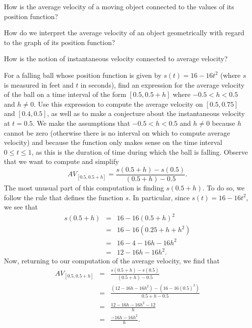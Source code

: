 \documentclass[symmetric,justified,marginals=justified,notoc]{tufte-book}
\theoremstyle{definition}
\begin{document}
\begin{goals}
\item How is the average velocity of a moving object connected to the values of its position function?
\item How do we interpret the average velocity of an object geometrically with regard to the graph of its position function?
\item How is the notion of instantaneous velocity connected to average velocity?
\end{goals}





\bex
For a falling ball whose position function is given by $s(t) = 16 - 16t^2$ (where $s$ is measured in feet and $t$ in seconds), find an expression for the average velocity of the ball on a time interval of the form $[0.5, 0.5+h]$ where $-0.5 < h < 0.5$ and $h \ne 0$.  Use this expression to compute the average velocity on $[0.5,0.75]$ and $[0.4,0.5]$, as well as to make a conjecture about the instantaneous velocity at $t = 0.5$.
\eex
We make the assumptions that $-0.5 < h < 0.5$ and $h \ne 0$ because $h$ cannot be zero (otherwise there is no interval on which to compute average velocity) and because the function only makes sense on the time interval $0 \le t \le 1$, as this is the duration of time during which the ball is falling.  Observe that we want to compute and simplify $$AV_{[0.5, 0.5+h]} = \frac{s(0.5+h) - s(0.5)}{(0.5+h) - 0.5}.$$  The most unusual part of this computation is finding $s(0.5+h)$.  To do so, we follow the rule that defines the function $s$.  In particular, since $s(t) = 16-16t^2$, we see that \begin{eqnarray*}
  s(0.5+h) & = & 16 - 16(0.5 + h)^2 \\
  		& = & 16 - 16(0.25 + h + h^2) \\
		& = & 16 - 4 - 16h - 16h^2 \\
		& = & 12 - 16h - 16h^2.
\end{eqnarray*}
Now, returning to our computation of the average velocity, we find that 
\begin{eqnarray*}
 AV_{[0.5, 0.5+h]} & = & \frac{s(0.5+h) - s(0.5)}{(0.5+h) - 0.5} \\
 			& = & \frac{(12 - 16h - 16h^2) - (16 - 16(0.5)^2)}{0.5 + h - 0.5} \\
			& = & \frac{12 - 16h - 16h^2 - 12}{h} \\
			& = & \frac{-16h - 16h^2}{h}.
\end{eqnarray*}
\end{document}
